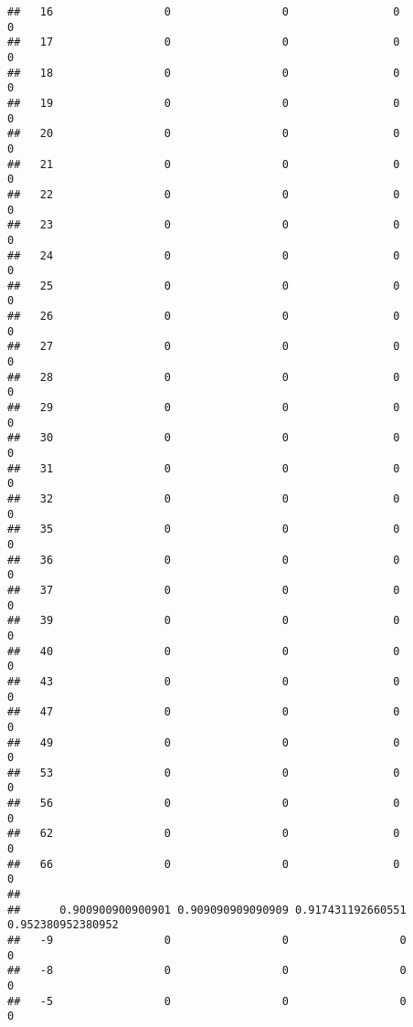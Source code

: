 \documentclass[]{article}
\begin{document}
\begin{verbatim}
##   16                 0                 0                0                 0
##   17                 0                 0                0                 0
##   18                 0                 0                0                 0
##   19                 0                 0                0                 0
##   20                 0                 0                0                 0
##   21                 0                 0                0                 0
##   22                 0                 0                0                 0
##   23                 0                 0                0                 0
##   24                 0                 0                0                 0
##   25                 0                 0                0                 0
##   26                 0                 0                0                 0
##   27                 0                 0                0                 0
##   28                 0                 0                0                 0
##   29                 0                 0                0                 0
##   30                 0                 0                0                 0
##   31                 0                 0                0                 0
##   32                 0                 0                0                 0
##   35                 0                 0                0                 0
##   36                 0                 0                0                 0
##   37                 0                 0                0                 0
##   39                 0                 0                0                 0
##   40                 0                 0                0                 0
##   43                 0                 0                0                 0
##   47                 0                 0                0                 0
##   49                 0                 0                0                 0
##   53                 0                 0                0                 0
##   56                 0                 0                0                 0
##   62                 0                 0                0                 0
##   66                 0                 0                0                 0
##     
##      0.900900900900901 0.909090909090909 0.917431192660551 0.952380952380952
##   -9                 0                 0                 0                 0
##   -8                 0                 0                 0                 0
##   -5                 0                 0                 0                 0

\end{verbatim}
\end{document}
